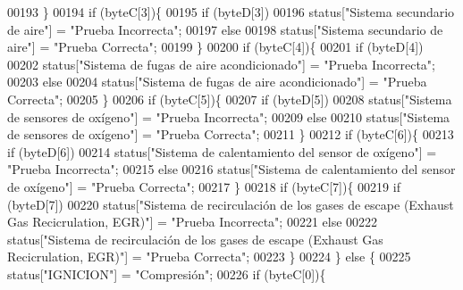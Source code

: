 \begin{DoxyCode}
00193         \}
00194         \textcolor{keywordflow}{if} (byteC[3])\{
00195             \textcolor{keywordflow}{if} (byteD[3])
00196                 status[\textcolor{stringliteral}{"Sistema secundario de aire"}] = \textcolor{stringliteral}{"Prueba Incorrecta"};
00197             \textcolor{keywordflow}{else}
00198                 status[\textcolor{stringliteral}{"Sistema secundario de aire"}] = \textcolor{stringliteral}{"Prueba Correcta"};
00199         \}
00200         \textcolor{keywordflow}{if} (byteC[4])\{
00201             \textcolor{keywordflow}{if} (byteD[4])
00202                 status[\textcolor{stringliteral}{"Sistema de fugas de aire acondicionado"}] = \textcolor{stringliteral}{"Prueba Incorrecta"};
00203             \textcolor{keywordflow}{else}
00204                 status[\textcolor{stringliteral}{"Sistema de fugas de aire acondicionado"}] = \textcolor{stringliteral}{"Prueba Correcta"};
00205         \}
00206         \textcolor{keywordflow}{if} (byteC[5])\{
00207             \textcolor{keywordflow}{if} (byteD[5])
00208                 status[\textcolor{stringliteral}{"Sistema de sensores de oxígeno"}] = \textcolor{stringliteral}{"Prueba Incorrecta"};
00209             \textcolor{keywordflow}{else}
00210                 status[\textcolor{stringliteral}{"Sistema de sensores de oxígeno"}] = \textcolor{stringliteral}{"Prueba Correcta"};
00211         \}
00212         \textcolor{keywordflow}{if} (byteC[6])\{
00213             \textcolor{keywordflow}{if} (byteD[6])
00214                 status[\textcolor{stringliteral}{"Sistema de calentamiento del sensor de oxígeno"}] = \textcolor{stringliteral}{"Prueba Incorrecta"};
00215             \textcolor{keywordflow}{else}
00216                 status[\textcolor{stringliteral}{"Sistema de calentamiento del sensor de oxígeno"}] = \textcolor{stringliteral}{"Prueba Correcta"};
00217         \}
00218         \textcolor{keywordflow}{if} (byteC[7])\{
00219             \textcolor{keywordflow}{if} (byteD[7])
00220                 status[\textcolor{stringliteral}{"Sistema de recirculación de los gases de escape (Exhaust Gas Recicrulation, EGR)"}] 
      = \textcolor{stringliteral}{"Prueba Incorrecta"};
00221             \textcolor{keywordflow}{else}
00222                 status[\textcolor{stringliteral}{"Sistema de recirculación de los gases de escape (Exhaust Gas Recicrulation, EGR)"}] 
      = \textcolor{stringliteral}{"Prueba Correcta"};
00223         \}
00224     \} \textcolor{keywordflow}{else} \{
00225         status[\textcolor{stringliteral}{"IGNICION"}] = \textcolor{stringliteral}{"Compresión"};
00226         \textcolor{keywordflow}{if} (byteC[0])\{

\end{DoxyCode}
